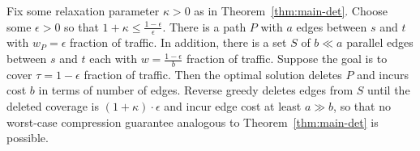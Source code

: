 \begin{example}
Fix some relaxation parameter $\kappa > 0$ as in Theorem~\ref{thm:main-det}. Choose some $\epsilon > 0$ so that $1+\kappa \le \frac{1-\epsilon}{\epsilon}$. There is a path $P$ with $a$ edges between $s$ and $t$ with $w_P = \epsilon$ fraction of traffic. In addition, there is a set $S$ of $b \ll a$ parallel edges between $s$ and $t$ each with $w = \frac{1-\epsilon}{b}$ fraction of traffic. Suppose the goal is to cover $\tau = 1-\epsilon$ fraction of traffic. Then the optimal solution deletes $P$ and incurs cost $b$ in terms of number of edges. Reverse greedy deletes edges from $S$ until the deleted coverage is $(1+\kappa) \cdot \epsilon$ and incur edge cost at least $a \gg b$, so that no worst-case compression guarantee analogous to Theorem~\ref{thm:main-det} is possible.
\end{example}
